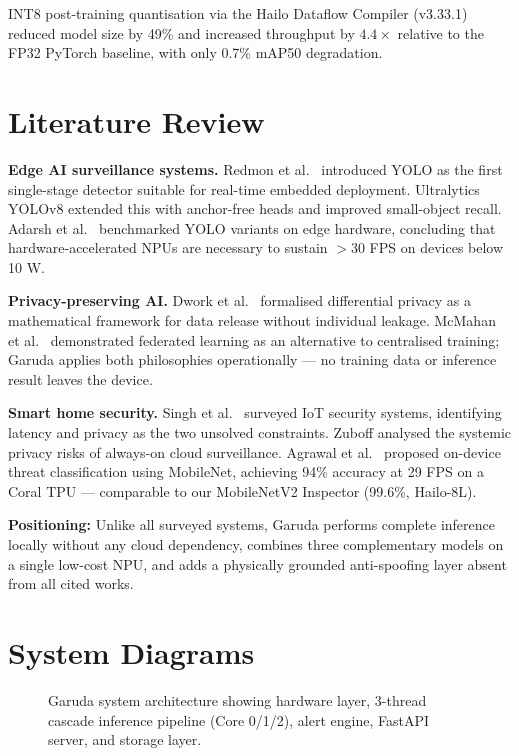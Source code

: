 \documentclass[12pt,a4paper]{article}
\begin{document}
INT8 post-training quantisation via the Hailo Dataflow Compiler (v3.33.1) reduced
model size by 49\% and increased throughput by $4.4\times$ relative to the FP32
PyTorch baseline, with only 0.7\% mAP50 degradation.

\section{Literature Review}

\textbf{Edge AI surveillance systems.}
Redmon et al.\ \cite{redmon2016} introduced YOLO as the first single-stage detector
suitable for real-time embedded deployment. Ultralytics YOLOv8 \cite{ultralytics2023}
extended this with anchor-free heads and improved small-object recall. Adarsh et al.\
\cite{adarsh2020} benchmarked YOLO variants on edge hardware, concluding that
hardware-accelerated NPUs are necessary to sustain $>$30 FPS on devices below 10 W.

\textbf{Privacy-preserving AI.}
Dwork et al.\ \cite{dwork2006} formalised differential privacy as a mathematical
framework for data release without individual leakage. McMahan et al.\ \cite{mcmahan2017}
demonstrated federated learning as an alternative to centralised training; Garuda
applies both philosophies operationally — no training data or inference result leaves
the device.

\textbf{Smart home security.}
Singh et al.\ \cite{singh2021} surveyed IoT security systems, identifying latency and
privacy as the two unsolved constraints. Zuboff \cite{zuboff2019} analysed the systemic
privacy risks of always-on cloud surveillance. Agrawal et al.\ \cite{agrawal2021}
proposed on-device threat classification using MobileNet, achieving 94\% accuracy at
29 FPS on a Coral TPU — comparable to our MobileNetV2 Inspector (99.6\%, Hailo-8L).

\textbf{Positioning:}
Unlike all surveyed systems, Garuda performs complete inference locally without any
cloud dependency, combines three complementary models on a single low-cost NPU, and
adds a physically grounded anti-spoofing layer absent from all cited works.

\section{System Diagrams}

\begin{figure}[h]
  \centering
  \caption{Garuda system architecture showing hardware layer, 3-thread cascade
           inference pipeline (Core 0/1/2), alert engine, FastAPI server, and
           storage layer.}
\end{figure}
\end{document}
